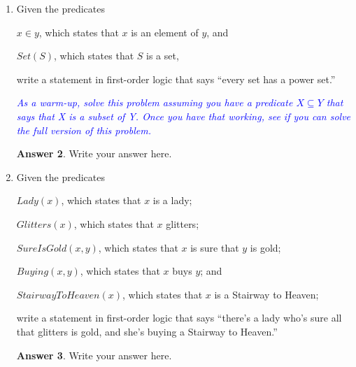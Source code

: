 \documentclass[a4paper]{article}
\renewcommand{\(}{\left(}
\renewcommand{\)}{\right)}
\theoremstyle{plain}
\theoremstyle{plain}
\theoremstyle{definition}
\newtheorem*{answer}{Answer}
\begin{document}
\begin{enumerate}[label*=\roman*.,ref=\roman*]
\qquad $x \in y$, which states that $x$ is an element of $y$, and

\qquad $\textit{Set}(S)$, which states that $S$ is a set,

write a statement in first-order logic that expresses the axiom of pairing.
\begin{shaded}
\begin{answer}
Write your answer here.
\end{answer}
\end{shaded}
\item Given the predicates

\qquad $x \in y$, which states that $x$ is an element of $y$, and

\qquad $\textit{Set}(S)$, which states that $S$ is a set,

write a statement in first-order logic that says
``every set has a power set.''

\textit{\textcolor{blue}{ As a warm-up, solve this problem assuming you have a predicate
$X \subseteq Y$ that says that X is a subset of Y.
Once you have that working, see if you can solve the full version of this problem. }}
\begin{shaded}
\begin{answer}
Write your answer here.
\end{answer}
\end{shaded}
\item Given the predicates

\qquad $\textit{Lady}(x)$, which states that $x$ is a lady;

\qquad $\textit{Glitters}(x)$, which states that $x$ glitters;

\qquad $\textit{SureIsGold}(x, y)$,
which states that $x$ is sure that $y$ is gold;

\qquad $\textit{Buying}(x, y)$, which states that $x$ buys $y$; and

\qquad $\textit{StairwayToHeaven}(x)$,
which states that $x$ is a Stairway to Heaven;

write a statement in first-order logic that says
``there's a lady who's sure all that glitters is gold,
and she's buying a Stairway to Heaven.''
\begin{shaded}
\begin{answer}
Write your answer here.
\end{answer}
\end{shaded}
\end{enumerate}
\end{document}
